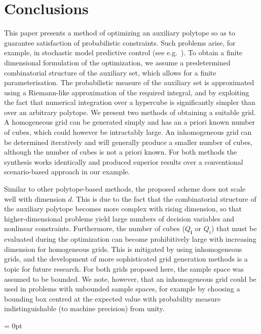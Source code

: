 \documentclass[letterpaper, 10pt, conference]{ieeeconf} %
\providecommand{\bfa}[1]{\mathbf{#1}}
\begin{document}
\section{Conclusions}\label{sec:conclusion}
%
%
%
%
%
\noindent This paper presents a method of optimizing an auxiliary polytope so as to guarantee satisfaction of probabilistic constraints. Such problems arise, for example, in stochastic model predictive control (see e.g.~\cite{Zhang2015,Fleming2016}).
%
To obtain a finite dimensional formulation of the optimization, we assume a predetermined combinatorial structure of the auxiliary set, which allows for a finite parameterisation. 
%
The probabilistic measure of the auxiliary set is approximated using a Riemann-like approximation of the required integral, and by exploiting the fact that numerical integration over a hypercube is significantly simpler than over an arbitrary polytope.
%
We present two methods of obtaining a suitable grid. A homogeneous grid can be generated simply and has an a priori known number of cubes, which could however be intractably large.
%
An inhomogeneous grid can be determined iteratively and will generally produce a smaller number of cubes, although the number of cubes is not a priori known.
%
For both methods the synthesis works identically and produced superior results over a conventional scenario-based approach in our example.
%


%
Similar to other polytope-based methods, the proposed scheme does not scale well with dimension $d$. This is due to the fact that the combinatorial structure of the auxiliary polytope becomes more complex with rising dimension, so that higher-dimensional problems yield large numbers of decision variables and nonlinear constraints.
%
Furthermore, the number of cubes ($Q_\bfa{i}$ or $Q_i$) that must be evaluated during the optimization can become prohibitively large with increasing dimension for homogeneous grids. This is mitigated by using inhomogeneous grids, and the development of more sophisticated grid generation methods is a  topic for future research.
%
For both grids proposed here, the sample space was assumed to be bounded. We note, however, that an inhomogeneous grid could be used in problems with unbounded sample spaces, for example by choosing a bounding box centred at the expected value with probability measure indistinguishable (to machine precision) from unity.


\parskip = 0pt

\end{document}
